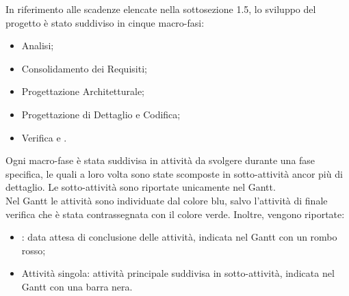 In riferimento alle scadenze elencate nella sottosezione 1.5, lo sviluppo del progetto è stato suddiviso in cinque macro-fasi:
\begin{itemize}
\item{Analisi;}
\item{Consolidamento dei Requisiti;}
\item{Progettazione Architetturale;}
\item{Progettazione di Dettaglio e Codifica;}
\item{Verifica e .}
\end{itemize}

Ogni macro-fase è stata suddivisa in attività da svolgere durante una fase specifica, le quali a loro volta sono state scomposte in sotto-attività ancor più di dettaglio. Le sotto-attività sono riportate unicamente nel Gantt. \\ Nel Gantt le attività sono individuate dal colore blu, salvo l'attività di finale verifica che è stata contrassegnata con il colore verde. Inoltre, vengono riportate:
\begin{itemize}
\item{: data attesa di conclusione delle attività, indicata nel Gantt con un rombo rosso;}
\item{Attività singola: attività principale suddivisa in sotto-attività, indicata nel Gantt con una barra nera.}
\end{itemize}






\pagebreak